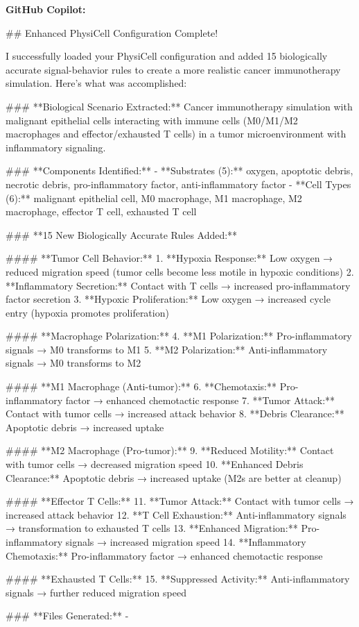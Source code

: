 \documentclass[11pt,a4paper]{article}
\begin{document}
\begin{copilotbox}
\textbf{GitHub Copilot:}

\#\# Enhanced PhysiCell Configuration Complete!

I successfully loaded your PhysiCell configuration and added 15 biologically accurate signal-behavior rules to create a more realistic cancer immunotherapy simulation. Here's what was accomplished:

\#\#\# **Biological Scenario Extracted:**
Cancer immunotherapy simulation with malignant epithelial cells interacting with immune cells (M0/M1/M2 macrophages and effector/exhausted T cells) in a tumor microenvironment with inflammatory signaling.

\#\#\# **Components Identified:**
- **Substrates (5):** oxygen, apoptotic debris, necrotic debris, pro-inflammatory factor, anti-inflammatory factor
- **Cell Types (6):** malignant epithelial cell, M0 macrophage, M1 macrophage, M2 macrophage, effector T cell, exhausted T cell

\#\#\# **15 New Biologically Accurate Rules Added:**

\#\#\#\# **Tumor Cell Behavior:**
1. **Hypoxia Response:** Low oxygen → reduced migration speed (tumor cells become less motile in hypoxic conditions)
2. **Inflammatory Secretion:** Contact with T cells → increased pro-inflammatory factor secretion
3. **Hypoxic Proliferation:** Low oxygen → increased cycle entry (hypoxia promotes proliferation)

\#\#\#\# **Macrophage Polarization:**
4. **M1 Polarization:** Pro-inflammatory signals → M0 transforms to M1 
5. **M2 Polarization:** Anti-inflammatory signals → M0 transforms to M2

\#\#\#\# **M1 Macrophage (Anti-tumor):**
6. **Chemotaxis:** Pro-inflammatory factor → enhanced chemotactic response
7. **Tumor Attack:** Contact with tumor cells → increased attack behavior
8. **Debris Clearance:** Apoptotic debris → increased uptake

\#\#\#\# **M2 Macrophage (Pro-tumor):**
9. **Reduced Motility:** Contact with tumor cells → decreased migration speed
10. **Enhanced Debris Clearance:** Apoptotic debris → increased uptake (M2s are better at cleanup)

\#\#\#\# **Effector T Cells:**
11. **Tumor Attack:** Contact with tumor cells → increased attack behavior  
12. **T Cell Exhaustion:** Anti-inflammatory signals → transformation to exhausted T cells
13. **Enhanced Migration:** Pro-inflammatory signals → increased migration speed
14. **Inflammatory Chemotaxis:** Pro-inflammatory factor → enhanced chemotactic response

\#\#\#\# **Exhausted T Cells:**
15. **Suppressed Activity:** Anti-inflammatory signals → further reduced migration speed

\#\#\# **Files Generated:**
-

\end{copilotbox}
\end{document}
